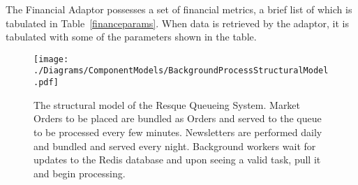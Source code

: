 The Financial Adaptor possesses a set of financial metrics, a brief
list of which is tabulated in Table~\ref{financeparams}. When
data is retrieved by the adaptor, it is tabulated with some of the
parameters shown in the table.


\begin{figure}
\label{queuestruct}
\centering
\texttt{[image: ./Diagrams/ComponentModels/BackgroundProcessStructuralModel.pdf]}
\caption{The structural model of the Resque Queueing System. Market Orders to be placed are 
bundled as Orders and served to the queue to be processed every few minutes. Newsletters are 
performed daily and bundled and served every night. Background workers wait for updates to
the Redis database and upon seeing a valid task, pull it and begin processing.}
\end{figure}

